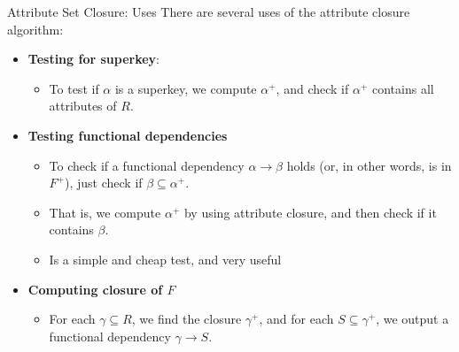 \documentclass[aspectratio=169, xcolor=dvipsnames]{beamer}
\begin{document}
\begin{frame}{Attribute Set Closure: Uses}
    There are several uses of the attribute closure algorithm:
    \begin{itemize}[<+->]
        \item \textbf{Testing for superkey}:
        \begin{itemize}
            \item[$\triangleright$] To test if $\alpha$ is a superkey, we compute $\alpha^+$, and check if $\alpha^+$ contains all attributes of $R$.
        \end{itemize}
        \item \textbf{Testing functional dependencies}
        \begin{itemize}
            \item[$\triangleright$] To check if a functional dependency $\alpha \rightarrow \beta$ holds (or, in other words, is in $F^+$), just check if $\beta \subseteq \alpha^+$.
            \item[$\triangleright$] That is, we compute $\alpha^+$ by using attribute closure, and then check if it contains $\beta$.
            \item[$\triangleright$] Is a simple and cheap test, and very useful
        \end{itemize}
        \item \textbf{Computing closure of $F$}
        \begin{itemize}
            \item[$\triangleright$] For each $\gamma \subseteq R$, we find the closure $\gamma^+$, and for each $S \subseteq \gamma^+$, we output a functional dependency $\gamma \rightarrow S$.
        \end{itemize}
    \end{itemize}
\end{frame}
\end{document}
